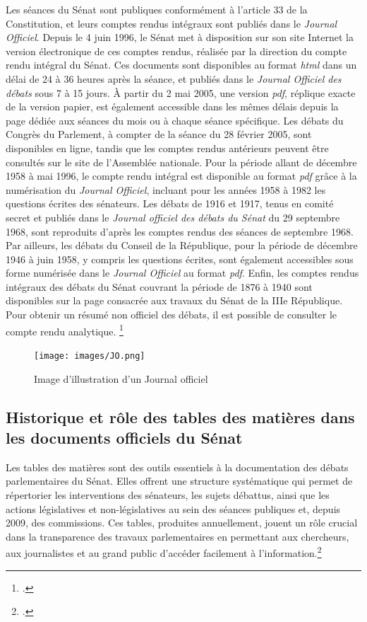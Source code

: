 Les séances du Sénat sont publiques conformément à l'article 33 de la Constitution, et leurs comptes rendus intégraux sont publiés dans le \textit{Journal Officiel}. Depuis le 4 juin 1996, le Sénat met à disposition sur son site Internet la version électronique de ces comptes rendus, réalisée par la direction du compte rendu intégral du Sénat. Ces documents sont disponibles au format \textit{html} dans un délai de 24 à 36 heures après la séance, et publiés dans le \textit{Journal Officiel des débats} sous 7 à 15 jours. À partir du 2 mai 2005, une version \textit{pdf}, réplique exacte de la version papier, est également accessible dans les mêmes délais depuis la page dédiée aux séances du mois ou à chaque séance spécifique. Les débats du Congrès du Parlement, à compter de la séance du 28 février 2005, sont disponibles en ligne, tandis que les comptes rendus antérieurs peuvent être consultés sur le site de l'Assemblée nationale. Pour la période allant de décembre 1958 à mai 1996, le compte rendu intégral est disponible au format \textit{pdf} grâce à la numérisation du \textit{Journal Officiel}, incluant pour les années 1958 à 1982 les questions écrites des sénateurs. Les débats de 1916 et 1917, tenus en comité secret et publiés dans le \textit{Journal officiel des débats du Sénat} du 29 septembre 1968, sont reproduits d’après les comptes rendus des séances de septembre 1968. Par ailleurs, les débats du Conseil de la République, pour la période de décembre 1946 à juin 1958, y compris les questions écrites, sont également accessibles sous forme numérisée dans le \textit{Journal Officiel} au format \textit{pdf}. Enfin, les comptes rendus intégraux des débats du Sénat couvrant la période de 1876 à 1940 sont disponibles sur la page consacrée aux travaux du Sénat de la IIIe République. Pour obtenir un résumé non officiel des débats, il est possible de consulter le compte rendu analytique. \footcite{senat_comptes_rendus}

\begin{figure}[H]
    \centering
    \texttt{[image: images/JO.png]}
    \caption{Image d'illustration d'un Journal officiel}
\end{figure}

\subsection{Historique et rôle des tables des matières dans les documents officiels du Sénat}

Les tables des matières sont des outils essentiels à la documentation des débats parlementaires du Sénat. Elles offrent une structure systématique qui permet de répertorier les interventions des sénateurs, les sujets débattus, ainsi que les actions législatives et non-législatives au sein des séances publiques et, depuis 2009, des commissions. Ces tables, produites annuellement, jouent un rôle crucial dans la transparence des travaux parlementaires en permettant aux chercheurs, aux journalistes et au grand public d'accéder facilement à l'information.\footcite{senat_tables_debats}

